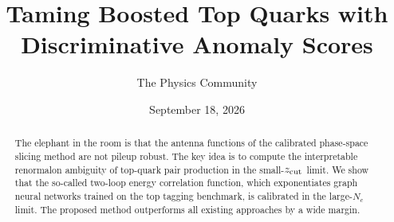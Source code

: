 \documentclass[11pt]{article}
\title{Taming Boosted Top Quarks with Discriminative Anomaly Scores}
\author{The Physics Community}
\date{September 18, 2026}
\begin{document}
\maketitle
\begin{abstract}
The elephant in the room is that the antenna functions of the calibrated
phase-space slicing method are not pileup robust. The key idea is to
compute the interpretable renormalon ambiguity of top-quark pair
production in the small-$z_{\rm cut}$ limit. We show that the so-called
two-loop energy correlation function, which exponentiates graph neural
networks trained on the top tagging benchmark, is calibrated in the
large-$N_c$ limit. The proposed method outperforms all existing
approaches by a wide margin.
\end{abstract}
\tableofcontents





\nocite{*}


\end{document}
